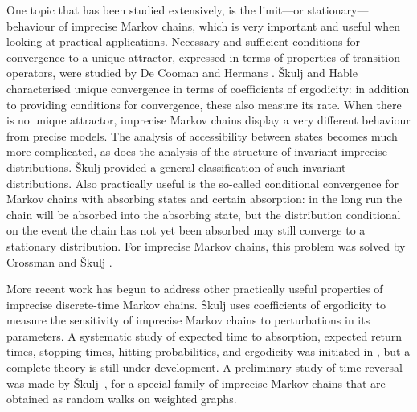 \documentclass[11pt,dvipsnames,usenames,a4paper]{article}
\begin{document}
One topic that has been studied extensively, is the limit---or stationary---behaviour of imprecise Markov chains, which is very important and useful when looking at practical applications.
Necessary and sufficient conditions for convergence to a unique attractor, expressed in terms of properties of transition operators, were studied by De Cooman and Hermans \cite{cooman2008,hermans2012}. %
Škulj and Hable \cite{skulj2013} characterised unique convergence in terms of coefficients of ergodicity: in addition to providing conditions for convergence, these also measure its rate. 
When there is no unique attractor, imprecise Markov chains display a very different behaviour from precise models. 
The analysis of accessibility between states becomes much more complicated, as does the analysis of the structure of invariant imprecise distributions. 
Škulj \cite{skulj:13b} provided a general classification of such invariant distributions. Also practically useful is the so-called conditional convergence for Markov chains with absorbing states and certain absorption: in the long run the chain will be absorbed into the absorbing state, but the distribution conditional on the event the chain has not yet been absorbed may still converge to a stationary distribution. 
For imprecise Markov chains, this problem was solved by Crossman and Škulj \cite{Crossman:2010}.

More recent work has begun to address other practically useful properties of imprecise discrete-time Markov chains.
Škulj \cite{skulj:2016b} uses coefficients of ergodicity to measure the sensitivity of imprecise Markov chains to perturbations in its parameters. 
A systematic study of expected time to absorption, expected return times, stopping times, hitting  probabilities, and ergodicity was initiated in \cite{troffaes:2013, cooman2015:markovergodic}, but a complete theory is still under development. 
A preliminary study of time-reversal  was made by Škulj~\cite{skulj2016}, for a special family of imprecise Markov chains that are obtained as random walks on weighted graphs. 
\end{document}
